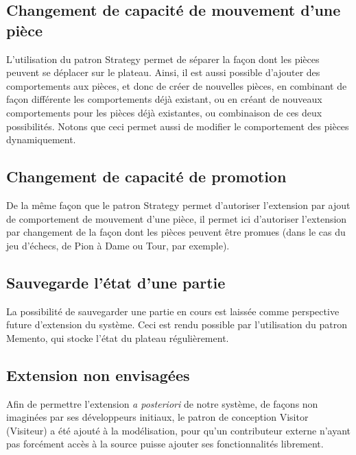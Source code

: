 \documentclass[11pt]{article}
\begin{document}
\subsection{Changement de capacité de mouvement d'une pièce}
\label{sec-4-2}
L'utilisation du patron Strategy permet de séparer la façon dont les pièces peuvent se déplacer sur le plateau. Ainsi, il est aussi possible d'ajouter des comportements aux pièces, et donc de créer de nouvelles pièces, en combinant de façon différente les comportements déjà existant, ou en créant de nouveaux comportements pour les pièces déjà existantes, ou combinaison de ces deux possibilités. Notons que ceci permet aussi de modifier le comportement des pièces dynamiquement.
\subsection{Changement de capacité de promotion}
\label{sec-4-3}
De la même façon que le patron Strategy permet d'autoriser l'extension par ajout de comportement de mouvement d'une pièce, il permet ici d'autoriser l'extension par changement de la façon dont les pièces peuvent être promues (dans le cas du jeu d'échecs, de Pion à Dame ou Tour, par exemple).
\subsection{Sauvegarde l'état d'une partie}
\label{sec-4-4}
La possibilité de sauvegarder une partie en cours est laissée comme perspective future d'extension du système. Ceci est rendu possible par l'utilisation du patron Memento, qui stocke l'état du plateau régulièrement.
\subsection{Extension non envisagées}
\label{sec-4-5}
Afin de permettre l'extension \emph{a posteriori} de notre système, de façons non imaginées par ses développeurs initiaux, le patron de conception Visitor (Visiteur) a été ajouté à la modélisation, pour qu'un contributeur externe n'ayant pas forcément accès à la source puisse ajouter ses fonctionnalités librement.
\end{document}
